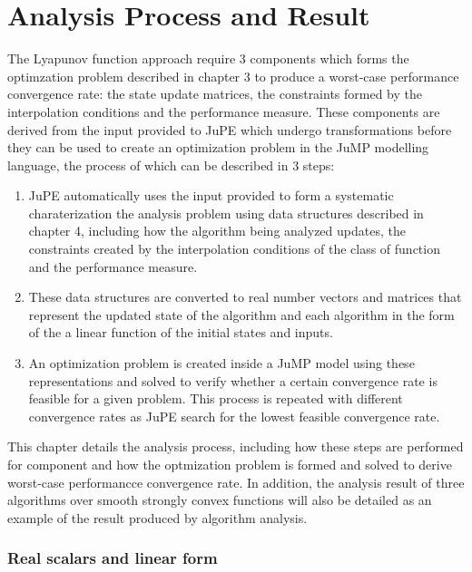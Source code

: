 \chapter{Analysis Process and Result}

The Lyapunov function approach require 3 components which forms the optimzation problem described in chapter 3 to produce a worst-case performance convergence rate: the state update matrices, the constraints formed by the interpolation conditions and the performance measure. These components are derived from the input provided to JuPE which undergo transformations before they can be used to create an optimization problem in the JuMP modelling language, the process of which can be described in 3 steps:
\begin{enumerate}
    \item JuPE automatically uses the input provided to form a systematic charaterization the analysis problem using data structures described in chapter 4, including how the algorithm being analyzed updates, the constraints created by the interpolation conditions of the class of function and the performance measure.
    \item These data structures are converted to real number vectors and matrices that represent the updated state of the algorithm and each algorithm in the form of the a linear function of the initial states and inputs.
    \item An optimization problem is created inside a JuMP model using these representations and solved to verify whether a certain convergence rate is feasible for a given problem. This process is repeated with different convergence rates as JuPE search for the lowest feasible convergence rate.
\end{enumerate}

This chapter details the analysis process, including how these steps are performed for component and how the optmization problem is formed and solved to derive worst-case performancce convergence rate. In addition, the analysis result of three algorithms over smooth strongly convex functions will also be detailed as an example of the result produced by algorithm analysis.

\subsection*{Real scalars and linear form}


